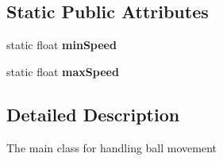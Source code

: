 \subsection*{Static Public Attributes}
\begin{DoxyCompactItemize}
\item 
\hypertarget{class_j_g___ball_a0e5845ccdb93030b567b796f6266e517}{static float {\bfseries min\-Speed}}\label{class_j_g___ball_a0e5845ccdb93030b567b796f6266e517}

\item 
\hypertarget{class_j_g___ball_ad830251662cdf8443962aef638ffefcc}{static float {\bfseries max\-Speed}}\label{class_j_g___ball_ad830251662cdf8443962aef638ffefcc}

\end{DoxyCompactItemize}


\subsection{Detailed Description}
The main class for handling ball movement 

